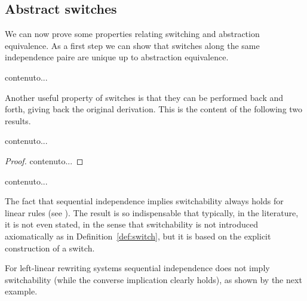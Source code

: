 \subsection{Abstract switches}
We can now prove some properties relating switching and abstraction equivalence. As a first step we can show that switches along the same independence paire are unique up to abstraction equivalence.




\begin{definition}
	contenuto...
\end{definition}


\begin{corollary}\label{cor:switch}
\end{corollary}



Another useful property of switches is that they can be performed back and forth, giving back the original derivation. This is the content of the following two results. 



\begin{proposition}
	contenuto...
\end{proposition}
\begin{proof}
	contenuto...
\end{proof}

\begin{corollary}
	contenuto...
\end{corollary}





The fact that sequential independence implies switchability always
holds for linear rules (see ). The result is so
indispensable that typically, in the literature, it is not even
stated, in the sense that switchability is not introduced
axiomatically as in Definition~\ref{def:switch}, but it is based on
the explicit construction of a switch.

For left-linear rewriting systems
sequential independence does not imply switchability (while the
converse implication clearly holds), as shown by the next example.

